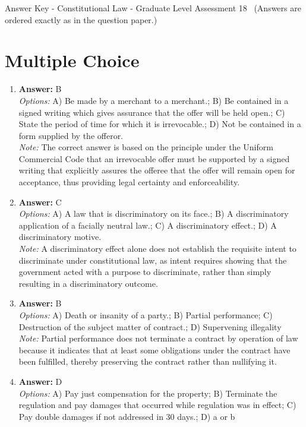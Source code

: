 \documentclass[12pt]{article}
\begin{document}
\begin{center}
Answer Key - Constitutional Law - Graduate Level Assessment 18 \
\small (Answers are ordered exactly as in the question paper.)
\end{center}

\section*{Multiple Choice}
\begin{enumerate}[label=\arabic*.]
\item \textbf{Answer:} B
\\ \textit{Options:} A) Be made by a merchant to a merchant.; B) Be contained in a signed writing which gives assurance that the offer will be held open.; C) State the period of time for which it is irrevocable.; D) Not be contained in a form supplied by the offeror.
\\ \textit{Note:} The correct answer is based on the principle under the Uniform Commercial Code that an irrevocable offer must be supported by a signed writing that explicitly assures the offeree that the offer will remain open for acceptance, thus providing legal certainty and enforceability.
\item \textbf{Answer:} C
\\ \textit{Options:} A) A law that is discriminatory on its face.; B) A discriminatory application of a facially neutral law.; C) A discriminatory effect.; D) A discriminatory motive.
\\ \textit{Note:} A discriminatory effect alone does not establish the requisite intent to discriminate under constitutional law, as intent requires showing that the government acted with a purpose to discriminate, rather than simply resulting in a discriminatory outcome.
\item \textbf{Answer:} B
\\ \textit{Options:} A) Death or insanity of a party.; B) Partial performance; C) Destruction of the subject matter of contract.; D) Supervening illegality
\\ \textit{Note:} Partial performance does not terminate a contract by operation of law because it indicates that at least some obligations under the contract have been fulfilled, thereby preserving the contract rather than nullifying it.
\item \textbf{Answer:} D
\\ \textit{Options:} A) Pay just compensation for the property; B) Terminate the regulation and pay damages that occurred while regulation was in effect; C) Pay double damages if not addressed in 30 days.; D) a or b

\end{enumerate}
\end{document}
